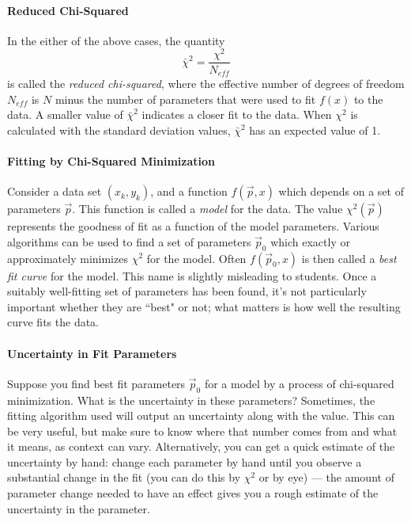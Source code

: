 \documentclass[11pt]{article}
\begin{document}
\paragraph*{Reduced Chi-Squared}
In the either of the above cases, the quantity
\begin{equation*}
\bar{\chi}^2 = \frac{\chi^2}{N_{eff}}
\end{equation*}
is called the  \textit{reduced chi-squared}, where the effective number of degrees of freedom $N_{eff}$ is $N$ minus the number of parameters that were used to fit $f(x)$ to the data. A smaller value of $\bar{\chi}^2$ indicates a closer fit to the data. When $\chi^2$ is calculated with the standard deviation values, $\bar{\chi}^2$ has an expected value of 1.


\paragraph*{Fitting by Chi-Squared Minimization}
Consider a data set $(x_k, y_k)$, and a function $f(\vec{p},x)$ which depends on a set of parameters $\vec{p}$. This function is called a \textit{model} for the data. The value $\chi^2(\vec{p})$ represents the goodness of fit as a function of the model parameters. Various algorithms can be used to find a set of parameters $\vec{p}_0$ which exactly or approximately minimizes $\chi^2$ for the model. Often $f(\vec{p}_0, x)$ is then called a \textit{best fit curve} for the model. This name is slightly misleading to students. Once a suitably well-fitting set of parameters has been found, it's not particularly important whether they are ``best" or not; what matters is how well the resulting curve fits the data.

\paragraph*{Uncertainty in Fit Parameters}
Suppose you find best fit parameters $\vec{p}_0$ for a model by a process of chi-squared minimization. What is the uncertainty in these parameters? Sometimes, the fitting algorithm used will output an uncertainty along with the value. This can be very useful, but make sure to know where that number comes from and what it means, as context can vary. Alternatively, you can get a quick estimate of the uncertainty by hand: change each parameter by hand until you observe a substantial change in the fit (you can do this by $\chi^2$ or by eye) --- the amount of parameter change needed to have an effect gives you a rough estimate of the uncertainty in the parameter.
\end{document}
